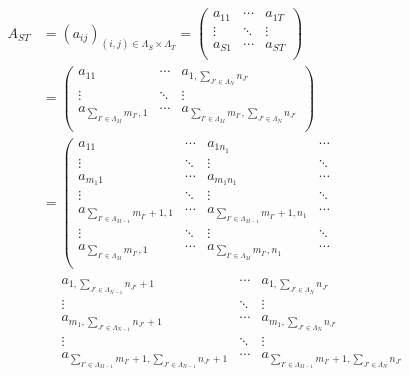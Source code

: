 \documentclass[dvipdfmx]{jsarticle}
\begin{document}
\begin{align*}
  A_{ST} &= \left( a_{ij} \right)_{(i,j) \in \varLambda_{S} \times \varLambda_{T}} = \begin{pmatrix}
  a_{11} & \cdots & a_{1T} \\
   \vdots & \ddots & \vdots \\
  a_{S1} & \cdots & a_{ST} \\
  \end{pmatrix} \\
  &= \begin{pmatrix}
  a_{11} & \cdots & a_{1,\sum_{J' \in \varLambda_{N}} n_{J'}} \\
   \vdots & \ddots & \vdots \\
  a_{\sum_{I' \in \varLambda_{M}} m_{I'},1} & \cdots & a_{\sum_{I' \in \varLambda_{M}} m_{I'},\sum_{J' \in \varLambda_{N}} n_{J'}} \\
  \end{pmatrix} \\
  &= \left( \begin{matrix}
  a_{11} & \cdots & a_{1n_{1}} & \cdots \\
   \vdots & \ddots & \vdots & \ddots \\
  a_{m_{1}1} & \cdots & a_{m_{1}n_{1}} & \cdots \\
   \vdots & \ddots & \vdots & \ddots \\
  a_{\sum_{I' \in \varLambda_{M - 1}} m_{I'} + 1,1} & \cdots & a_{\sum_{I' \in \varLambda_{M - 1}} m_{I'} + 1,n_{1}} & \cdots \\
   \vdots & \ddots & \vdots & \ddots \\
  a_{\sum_{I' \in \varLambda_{M}} m_{I'},1} & \cdots & a_{\sum_{I' \in \varLambda_{M}} m_{I'},n_{1}} & \cdots \\
  \end{matrix} \right. \\
  &\quad \left. \begin{matrix}
  a_{1,\sum_{J' \in \varLambda_{N - 1}} n_{J'} + 1} & \cdots & a_{1,\sum_{J' \in \varLambda_{N}} n_{J'}} \\
    \vdots & \ddots & \vdots \\
  a_{m_{1},\sum_{J' \in \varLambda_{N - 1}} n_{J'} + 1} & \cdots & a_{m_{1},\sum_{J' \in \varLambda_{N}} n_{J'}} \\
    \vdots & \ddots & \vdots \\
  a_{\sum_{I' \in \varLambda_{M - 1}} m_{I'} + 1,\sum_{J' \in \varLambda_{N - 1}} n_{J'} + 1} & \cdots & a_{\sum_{I' \in \varLambda_{M - 1}} m_{I'} + 1,\sum_{J' \in \varLambda_{N}} n_{J'}} \\

\end{matrix}
\end{align*}
\end{document}
